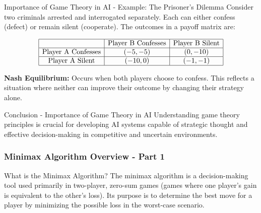 \documentclass[aspectratio=169]{beamer}
\begin{document}
\begin{frame}[fragile]{Importance of Game Theory in AI - Example: The Prisoner's Dilemma}
    Consider two criminals arrested and interrogated separately. Each can either confess (defect) or remain silent (cooperate). The outcomes in a payoff matrix are:

    \[
    \begin{array}{|c|c|c|}
        \hline
        & \text{Player B Confesses} & \text{Player B Silent} \\
        \hline
        \text{Player A Confesses} & (-5, -5) & (0, -10) \\
        \hline
        \text{Player A Silent} & (-10, 0) & (-1, -1) \\
        \hline
    \end{array}
    \]

    \textbf{Nash Equilibrium:} Occurs when both players choose to confess. This reflects a situation where neither can improve their outcome by changing their strategy alone.
\end{frame}

\begin{frame}[fragile]{Conclusion - Importance of Game Theory in AI}
    Understanding game theory principles is crucial for developing AI systems capable of strategic thought and effective decision-making in competitive and uncertain environments.
\end{frame}

\begin{frame}[fragile]
    \frametitle{Minimax Algorithm Overview - Part 1}
    \begin{block}{What is the Minimax Algorithm?}
        The minimax algorithm is a decision-making tool used primarily in two-player, zero-sum games (games where one player's gain is equivalent to the other's loss). Its purpose is to determine the best move for a player by minimizing the possible loss in the worst-case scenario.
    \end{block}
\end{frame}
\end{document}
